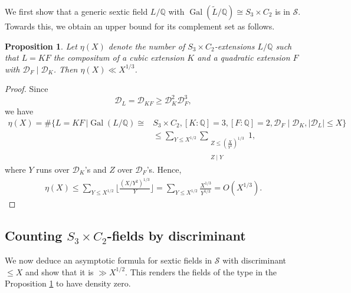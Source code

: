 \documentclass[11pt,reqno]{amsart}
\newcommand{\Q}{\mathbb{Q}}
\newcommand{\cD}{\mathcal{D}}
\newcommand{\cS}{\mathcal{S}}
\DeclareMathOperator{\Gal}{Gal}
\newtheorem{proposition}[theorem]{Proposition}
\theoremstyle{definition}
\theoremstyle{remark}
\begin{document}
We first show that a generic sextic field $L/\Q$ with $\Gal(\widetilde{L}/\Q)\cong S_3\times C_2$ is in $\cS$. Towards this, we obtain an upper bound for its complement set as follows.
\begin{proposition}\label{most-S_3-C_2}
    Let $\eta(X)$ denote the number of $S_3\times C_2$-extensions $L/\Q$ such that $L=KF$ the compositum of a cubic extension $K$ and a quadratic extension $F$ with $\cD_F\mid \cD_K$. Then $\eta(X)\ll X^{1/3}$. 
\end{proposition}
\begin{proof}
    Since 
    $$
        \cD_L = \cD_{KF} \geq \cD_K^2 \cD_F^3,
    $$
    we have
    \begin{align*}
       \eta(X) = \#\bigg\{L=KF \,\bigg| \Gal(L/\Q)\cong &S_3\times C_2, [K:\Q]=3, [F:\Q]=2, \cD_F\mid \cD_K, |\cD_L|\leq X\bigg\}\\
       &\leq \sum_{Y\leq X^{1/2}} \sum_{\substack{Z\leq \left(\frac{X}{Y^2}\right)^{1/3}\\\\ Z\mid Y}} 1,
    \end{align*}
    where $Y$ runs over $\cD_K$'s and $Z$ over $\cD_F$'s. Hence,
    \begin{align*}
        \eta(X)  \leq \sum_{Y\leq X^{1/2}} \bigg\lfloor \frac{(X/Y^2)^{1/3}}{Y}\bigg\rfloor = \sum_{Y\leq X^{1/2}} \frac{X^{1/3}}{Y^{5/3}}= O(X^{1/3}).
    \end{align*}
    
\end{proof}
\medskip

\subsection{Counting $S_3\times C_2$-fields by discriminant}
We now deduce an asymptotic formula for sextic fields in $\cS$ with discriminant $\leq X$ and show that it is $\gg X^{1/2}$. This renders the fields of the type in the Proposition \ref{most-S_3-C_2} to have density zero.
\end{document}

